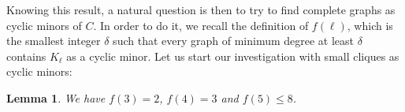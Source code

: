 \documentclass[11pt]{article}
\newtheorem{lemma}[theo]{Lemma}
\begin{document}
Knowing this result, a natural question is then to try to find complete graphs as cyclic minors of $C$. In order to do it, we recall the definition of $f(\ell)$, which is the smallest integer $\delta$ such that every graph of minimum degree at least $\delta$ contains $K_\ell$ as a cyclic minor. Let us start our investigation with small cliques as cyclic minors:


\begin{lemma}\label{l:clique}
We have $f(3)=2$, $f(4)=3$ and $f(5) \leq 8$. 
\end{lemma}


\end{document}
